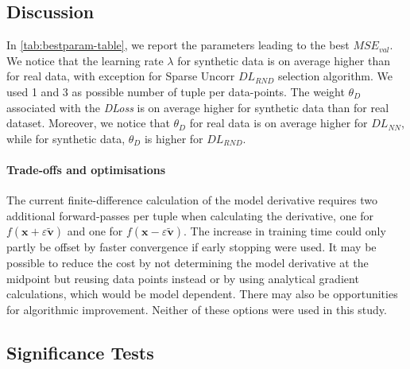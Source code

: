 \documentclass{article}
\newcommand{\kibitz}[2]{\ifnum\Comments=1\textcolor{#1}{#2}\fi}
\newcommand{\kizito}[1]{\kibitz{red} {[Kizito: #1]}}
\newcommand{\enrico}[1]{\kibitz{blue} {[Enrico: #1]}}
\begin{document}

\subsection{Discussion}\label{sec:discussion}

In \autoref{tab:bestparam-table}, we report the parameters leading to the best $MSE_{val}$. 
We notice that the learning rate $\lambda$ for synthetic data is on average higher than for real data, with exception for Sparse Uncorr $DL_{RND}$ selection algorithm.
We used 1 and 3 as possible number of tuple per data-points.
The weight $\theta_{D}$ associated with the \emph{DLoss} is on average higher for synthetic data than for real dataset.
Moreover, we notice that $\theta_{D}$ for real data is on average higher for $DL_{NN}$, while for synthetic data, $\theta_{D}$ is higher for $DL_{RND}$. 

\paragraph{Trade-offs and optimisations}
The current finite-difference calculation of the model derivative requires two additional forward-passes per tuple when calculating the derivative, one for $f(\mathbf{x}+\varepsilon\tilde{\mathbf{v}})$ and one for $f(\mathbf{x}-\varepsilon\tilde{\mathbf{v}})$.
The increase in training time could only partly be offset by faster convergence if early stopping were used. 
It may be possible to reduce the cost by not determining the model derivative at the midpoint but reusing data points instead or by using analytical gradient calculations, which would be model dependent. 
There may also be opportunities for algorithmic improvement.
Neither of these options were used in this study. 


\subsection{Significance Tests} 
\end{document}
